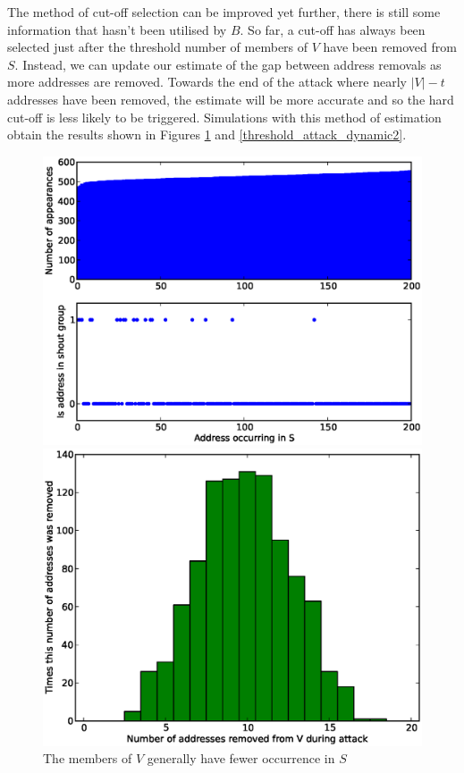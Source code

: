 \documentclass[ %
                    author={Luke Murray},
                supervisor={Dr. Simon Hollis},
                     title={Shadow Peer-to-Peer Networks},
                  subtitle={},
                    degree={MEng},
                      year={2013} ]{thesis}
\begin{document}
The method of cut-off selection can be improved yet further, there is still some information that hasn't been utilised by $B$. So far, a cut-off has always been selected just after the threshold number of members of $V$ have been removed from $S$. Instead, we can update our estimate of the gap between address removals as more addresses are removed. Towards the end of the attack where nearly $|V| - t$ addresses have been removed, the estimate will be more accurate and so the hard cut-off is less likely to be triggered. Simulations with this method of estimation obtain the results shown in Figures \ref{threshold_attack_dynamic1} and \ref{threshold_attack_dynamic2}.
 
\begin{figure}[h]
    \centering
    \begin{minipage}[b]{0.45\linewidth}
        \centering
        \includegraphics[width=\linewidth]{diagrams/dyn1.eps}
        \caption{The members of $V$ generally have fewer occurrence in $S$}
        \label{threshold_attack_dynamic1}
    \end{minipage}
    \hspace{0.5cm}
    \begin{minipage}[b]{0.45\linewidth}
        \centering
        \includegraphics[width=\linewidth]{diagrams/dyn2.eps}

\end{minipage}
\end{figure}
\end{document}
